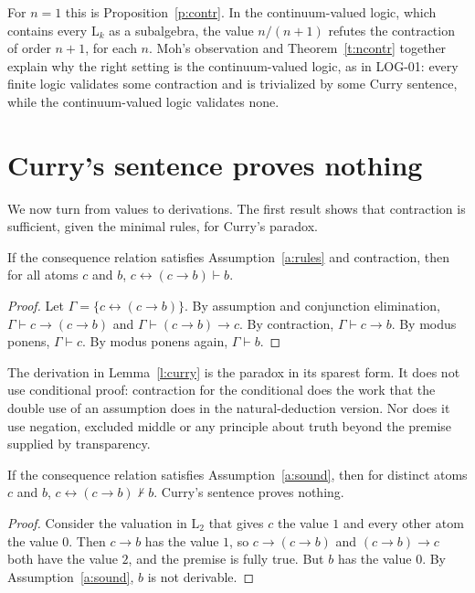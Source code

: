 \documentclass{situationist-preprint}
\begin{document}
For $n = 1$ this is Proposition~\ref{p:contr}. In the continuum-valued logic, which contains every $\mathrm{L}_k$ as a subalgebra, the value $n/(n+1)$ refutes the contraction of order $n+1$, for each $n$. Moh's observation and Theorem~\ref{t:ncontr} together explain why the right setting is the continuum-valued logic, as in LOG-01: every finite logic validates some contraction and is trivialized by some Curry sentence, while the continuum-valued logic validates none.

\section{Curry's sentence proves nothing}\label{s:proof}

We now turn from values to derivations. The first result shows that contraction is sufficient, given the minimal rules, for Curry's paradox.

\begin{lemma}\label{l:curry}
If the consequence relation satisfies Assumption~\ref{a:rules} and contraction, then for all atoms $c$ and $b$, $c \leftrightarrow (c \to b) \vdash b$.
\end{lemma}

\begin{proof}
Let $\Gamma = \{c \leftrightarrow (c \to b)\}$. By assumption and conjunction elimination, $\Gamma \vdash c \to (c \to b)$ and $\Gamma \vdash (c \to b) \to c$. By contraction, $\Gamma \vdash c \to b$. By modus ponens, $\Gamma \vdash c$. By modus ponens again, $\Gamma \vdash b$.
\end{proof}

The derivation in Lemma~\ref{l:curry} is the paradox in its sparest form. It does not use conditional proof: contraction for the conditional does the work that the double use of an assumption does in the natural-deduction version. Nor does it use negation, excluded middle or any principle about truth beyond the premise supplied by transparency.

\begin{theorem}\label{t:nothing}
If the consequence relation satisfies Assumption~\ref{a:sound}, then for distinct atoms $c$ and $b$, $c \leftrightarrow (c \to b) \nvdash b$. Curry's sentence proves nothing.
\end{theorem}

\begin{proof}
Consider the valuation in $\mathrm{L}_2$ that gives $c$ the value $1$ and every other atom the value $0$. Then $c \to b$ has the value $1$, so $c \to (c \to b)$ and $(c \to b) \to c$ both have the value $2$, and the premise is fully true. But $b$ has the value $0$. By Assumption~\ref{a:sound}, $b$ is not derivable.
\end{proof}
\end{document}
